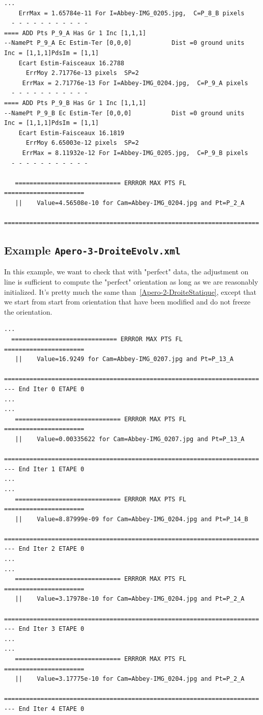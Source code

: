 \begin{verbatim}
...
    ErrMax = 1.65784e-11 For I=Abbey-IMG_0205.jpg,  C=P_8_B pixels
  - - - - - - - - - - -
==== ADD Pts P_9_A Has Gr 1 Inc [1,1,1]
--NamePt P_9_A Ec Estim-Ter [0,0,0]           Dist =0 ground units
Inc = [1,1,1]PdsIm = [1,1]
    Ecart Estim-Faisceaux 16.2788
      ErrMoy 2.71776e-13 pixels  SP=2
     ErrMax = 2.71776e-13 For I=Abbey-IMG_0204.jpg,  C=P_9_A pixels
  - - - - - - - - - - -
==== ADD Pts P_9_B Has Gr 1 Inc [1,1,1]
--NamePt P_9_B Ec Estim-Ter [0,0,0]           Dist =0 ground units
Inc = [1,1,1]PdsIm = [1,1]
    Ecart Estim-Faisceaux 16.1819
      ErrMoy 6.65003e-12 pixels  SP=2
     ErrMax = 8.11932e-12 For I=Abbey-IMG_0205.jpg,  C=P_9_B pixels
  - - - - - - - - - - -

   ============================= ERRROR MAX PTS FL ======================
   ||    Value=4.56508e-10 for Cam=Abbey-IMG_0204.jpg and Pt=P_2_A
   ======================================================================
\end{verbatim}


\subsection{Example {\tt Apero-3-DroiteEvolv.xml}}

In this example, we  want to check that with "perfect" data, the adjustment on line
is sufficient to compute the "perfect" orientation as long as we are reasonably initialized.
It's pretty much the same than~\ref{Apero-2-DroiteStatique},
except that we start from start from orientation that have been modified and
do not freeze the orientation.


\begin{verbatim}
...
  ============================= ERRROR MAX PTS FL ======================
   ||    Value=16.9249 for Cam=Abbey-IMG_0207.jpg and Pt=P_13_A
   ======================================================================
--- End Iter 0 ETAPE 0
...
...
   ============================= ERRROR MAX PTS FL ======================
   ||    Value=0.00335622 for Cam=Abbey-IMG_0207.jpg and Pt=P_13_A
   ======================================================================
--- End Iter 1 ETAPE 0
...
...
   ============================= ERRROR MAX PTS FL ======================
   ||    Value=8.87999e-09 for Cam=Abbey-IMG_0204.jpg and Pt=P_14_B
   ======================================================================
--- End Iter 2 ETAPE 0
...
...
   ============================= ERRROR MAX PTS FL ======================
   ||    Value=3.17978e-10 for Cam=Abbey-IMG_0204.jpg and Pt=P_2_A
   ======================================================================
--- End Iter 3 ETAPE 0
...
...
   ============================= ERRROR MAX PTS FL ======================
   ||    Value=3.17775e-10 for Cam=Abbey-IMG_0204.jpg and Pt=P_2_A
   ======================================================================
--- End Iter 4 ETAPE 0

\end{verbatim}

